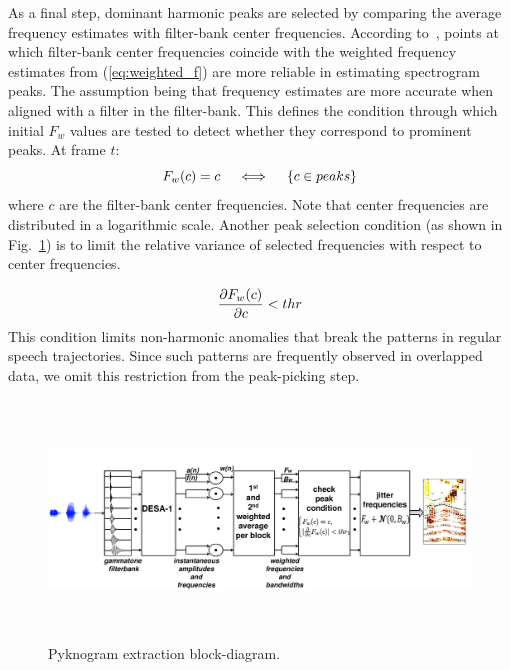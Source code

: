 {As a final step, dominant harmonic peaks are selected by comparing the average frequency estimates with filter-bank center frequencies. 
According to~\cite{potamianos_maragos_jasa96}, points at which filter-bank center frequencies coincide with the weighted frequency estimates from (\ref{eq:weighted_f}) are more reliable in estimating spectrogram peaks. 
The assumption being that frequency estimates are more accurate when aligned with a filter in the filter-bank. 
This defines the condition through which initial $F_w$ values are tested to detect whether they correspond to prominent peaks. At frame $t$: 
\vspace{0mm}
\begin{equation}
\label{eq:RF1}
F_w(c) = c  \quad \iff \quad \{c \in peaks\}
\vspace{1mm}
\end{equation}
where $c$ are the filter-bank center frequencies. 
Note that center frequencies are distributed in a logarithmic scale. 
Another peak selection condition (as shown in Fig.~\ref{fig:pykno_blockdiag}) is to limit the relative variance of selected frequencies with respect to center frequencies. 

\begin{equation}
\label{eq:RF1}
\frac{\partial F_w(c)}{\partial c} < thr
\vspace{1mm}
\end{equation}
This condition limits non-harmonic anomalies that break the patterns in regular speech trajectories. 
Since such patterns are frequently observed in overlapped data, we omit this restriction from the peak-picking step.  

\begin{figure}[t!]
	\centering
	\vspace{0mm}
	\includegraphics[height = 2.5in, width=1\textwidth]{figures/pyknogram_blockdiagram}
	\vspace{-3mm}
	\caption{Pyknogram extraction block-diagram.}
	\label{fig:pykno_blockdiag}
	\vspace{-3mm}
\end{figure}


}
